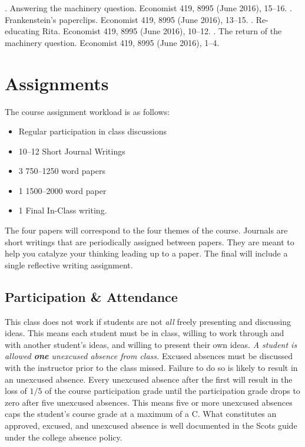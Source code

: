 \documentclass[nobib]{tufte-handout}
\begin{document}
\newline \vspace{.15in}
. Answering the machinery question. Economist 419, 8995 (June 2016), 15--16.
\newline \vspace{.15in}
. Frankenstein's paperclips. Economist 419, 8995 (June 2016), 13--15.
\newline \vspace{.15in}
. Re-educating Rita. Economist 419, 8995 (June 2016), 10--12.
\newline \vspace{.15in}
. The return of the machinery question. Economist 419, 8995 (June 2016), 1--4.


\section{Assignments}

The course assignment workload is as follows:
\begin{itemize}
\item Regular participation in class discussions
\item 10--12 Short Journal Writings
\item 3 750--1250 word papers
\item 1 1500--2000 word paper
\item 1 Final In-Class writing.
\end{itemize}
The four papers will correspond to the four themes of the course. Journals are short writings that are periodically assigned between papers. They are meant to help you catalyze your thinking leading up to a paper. The final will include a single reflective writing assignment.

\subsection{Participation \& Attendance}

This class does not work if students are not \textit{all} freely presenting and discussing ideas.  This means each student must be in class, willing to work through and with another student's ideas, and willing to present their own ideas.  \textit{A student is allowed \textbf{one} unexcused absence from class.} Excused absences must be discussed with the instructor prior to the class missed.  Failure to do so is likely to result in an unexcused absence.  Every unexcused absence after the first will result in the loss of \(1/5\) of the course participation grade until the participation grade drops to zero after five unexcused absences. This means five or more unexcused absences caps the student's course grade at a maximum of a C. What constitutes an approved, excused, and unexcused absence is well documented in the Scots guide under the college absence policy.
\end{document}
